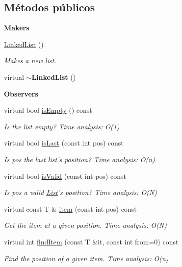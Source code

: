 \subsection*{Métodos públicos}
\begin{Indent}{\bf Makers}\par
\begin{DoxyCompactItemize}
\item 
\hyperlink{classedi_1_1LinkedList_a9d73280d0e4d87c3e71cbc7bdffd7569}{Linked\+List} ()
\begin{DoxyCompactList}\small\item\em Makes a new list. \end{DoxyCompactList}\item 
\hypertarget{classedi_1_1LinkedList_a09861de811ffc9e1798b624d0d9de56e}{virtual {\bfseries $\sim$\+Linked\+List} ()}\label{classedi_1_1LinkedList_a09861de811ffc9e1798b624d0d9de56e}

\end{DoxyCompactItemize}
\end{Indent}
\begin{Indent}{\bf Observers}\par
\begin{DoxyCompactItemize}
\item 
virtual bool \hyperlink{classedi_1_1LinkedList_a441bd0ce83f968bfd035898aee35ce07}{is\+Empty} () const 
\begin{DoxyCompactList}\small\item\em Is the list empty? Time analysis\+: O(1) \end{DoxyCompactList}\item 
virtual bool \hyperlink{classedi_1_1LinkedList_a4613b0e1e24af6da544c7925b47d4ade}{is\+Last} (const int pos) const 
\begin{DoxyCompactList}\small\item\em Is pos the last list's position? Time analysis\+: O(n) \end{DoxyCompactList}\item 
virtual bool \hyperlink{classedi_1_1LinkedList_ace987043504bd3c24845249fa4b2bdb4}{is\+Valid} (const int pos) const 
\begin{DoxyCompactList}\small\item\em Is pos a valid \hyperlink{classedi_1_1List}{List}'s position? Time analysis\+: O(\+N) \end{DoxyCompactList}\item 
virtual const T \& \hyperlink{classedi_1_1LinkedList_a9b964bff1d09e65a96150e8fe4317912}{item} (const int pos) const 
\begin{DoxyCompactList}\small\item\em Get the item at a given position. Time analysis\+: O(\+N) \end{DoxyCompactList}\item 
virtual int \hyperlink{classedi_1_1LinkedList_ac60ccc9991289e28a617fbfd819350de}{find\+Item} (const T \&it, const int from=0) const 
\begin{DoxyCompactList}\small\item\em Find the position of a given item. Time analysis\+: O(n) \end{DoxyCompactList}\end{DoxyCompactItemize}
\end{Indent}
